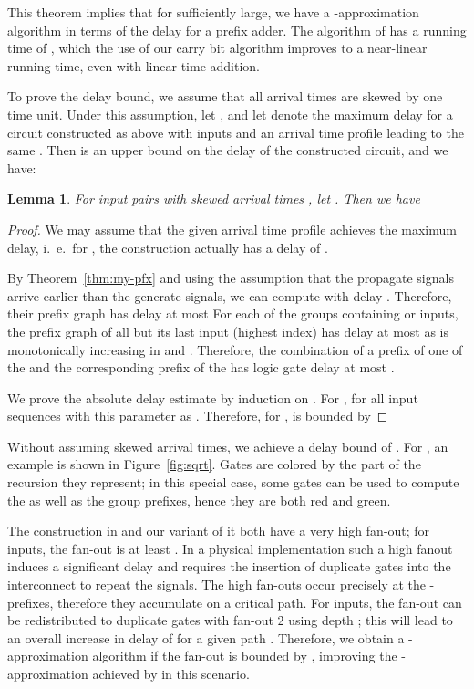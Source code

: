 \documentclass[11pt,final,microtype]{scrartcl}
\theoremstyle{plain}
\newtheorem{lemma}[theorem]{Lemma}
\theoremstyle{definition}
\theoremstyle{remark}
\newcommand{\tikzfigs}[3]{
  \begin{figure}[!tb]\centering{\resizebox{#2\linewidth}{!}{\begin{tikzpicture}
          
        \end{tikzpicture}}\caption{#1}\label{fig:#3}}\end{figure}}
\begin{document}
This theorem implies that for  sufficiently large, we have a
-approximation algorithm in terms of the delay for a prefix
adder. The algorithm of \cite{bonn2} has a running time of
, which the use of our carry bit algorithm improves to a
near-linear running time, even with linear-time addition.


To prove the delay bound, we assume that all arrival
times are skewed by one time unit. Under this assumption, let , and let  denote the maximum
delay for a circuit constructed as above with  inputs and an
arrival time profile leading to the same . Then  is
an upper bound on the delay of the constructed circuit, and we have:

\begin{lemma} \label{lem:delay-bl-pfx} For  input pairs with skewed arrival
  times , let . Then we have
  
\end{lemma}
\begin{proof}
  We may assume that the given arrival time profile achieves the
  maximum delay, i.\ e.\ for , the construction
  actually has a delay of .
 
  By Theorem~\ref{thm:my-pfx} and using the assumption that the
  propagate signals arrive earlier than the generate signals, we can
  compute  with delay . Therefore, their prefix graph has delay
  at most  For each of the groups 
  containing  or  inputs, the
  prefix graph of all but its last input (highest index) has delay at
  most  as  is monotonically increasing
  in  and . Therefore, the combination of a prefix of one of the
   and the corresponding prefix of the  has logic gate delay
  at most . 

  We prove the absolute delay estimate by induction on . For ,  for all input
  sequences with this parameter  as . Therefore, for ,  is bounded by
  
\end{proof}

Without assuming skewed arrival times, we achieve a delay bound
of . For , an example is shown in
Figure~\ref{fig:sqrt}. Gates are colored by the part of the recursion
they represent; in this special case, some gates can be used to compute
the  as well as the group prefixes, hence they are both red and
green.

\tikzfigs{Parallel prefix graph for uniform arrival times}{0.8}{sqrt}

The construction in \cite{bonn2} and our variant of it both have a
very high fan-out; for  inputs, the fan-out is at least
. In a physical implementation such a high fanout
induces a significant delay and requires the insertion of
duplicate gates into the interconnect to repeat the signals. The high
fan-outs occur precisely at the -prefixes, therefore they
accumulate on a critical path. For  inputs, the fan-out can be
redistributed to duplicate gates with fan-out 2 using depth
; this will lead to an overall increase
in delay of  for a given path
\cite{bonn2}. Therefore, we obtain a -approximation algorithm if
the fan-out is bounded by , improving the -approximation
achieved by \cite{bonn2} in this scenario.
\end{document}
